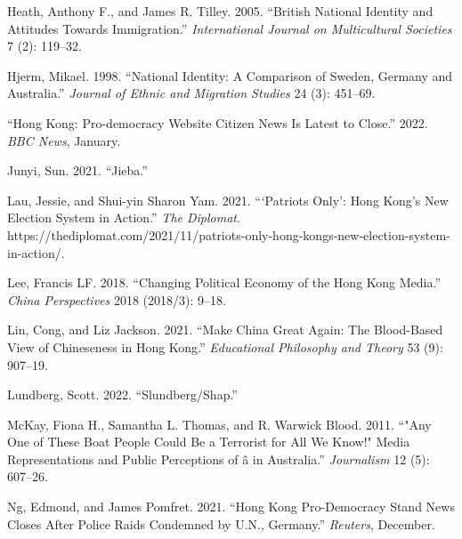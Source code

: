 \documentclass[a4paper, oneside]{report}
\begin{document}
\begin{CSLReferences}{1}{0}
\leavevmode{}%
Heath, Anthony F., and James R. Tilley. 2005. {``British National
Identity and Attitudes Towards Immigration.''} \emph{International
Journal on Multicultural Societies} 7 (2): 119--32.

\leavevmode{}%
Hjerm, Mikael. 1998. {``National Identity: {A} Comparison of {Sweden},
{Germany} and {Australia}.''} \emph{Journal of Ethnic and Migration
Studies} 24 (3): 451--69.

\leavevmode{}%
{``Hong {Kong}: {Pro-democracy} Website {Citizen News} Is Latest to
Close.''} 2022. \emph{BBC News}, January.

\leavevmode{}%
Junyi, Sun. 2021. {``Jieba.''}

\leavevmode{}%
Lau, Jessie, and Shui-yin Sharon Yam. 2021. {``{`{Patriots Only}'}:
{Hong Kong}'s {New Election System} in {Action}.''} \emph{The Diplomat}.
https://thediplomat.com/2021/11/patriots-only-hong-kongs-new-election-system-in-action/.

\leavevmode{}%
Lee, Francis LF. 2018. {``Changing Political Economy of the {Hong Kong}
Media.''} \emph{China Perspectives} 2018 (2018/3): 9--18.

\leavevmode{}%
Lin, Cong, and Liz Jackson. 2021. {``Make {China} Great Again: {The}
Blood-Based View of {Chineseness} in {Hong Kong}.''} \emph{Educational
Philosophy and Theory} 53 (9): 907--19.

\leavevmode{}%
Lundberg, Scott. 2022. {``Slundberg/Shap.''}

\leavevmode{}%
McKay, Fiona H., Samantha L. Thomas, and R. Warwick Blood. 2011.
{``"{Any} One of These Boat People Could Be a Terrorist for All We
{Know}!" {Media} Representations and Public Perceptions of
â\texteuro{}\texteuro{}
in {Australia}.''} \emph{Journalism} 12 (5): 607--26.

\leavevmode{}%
Ng, Edmond, and James Pomfret. 2021. {``Hong {Kong} Pro-Democracy {Stand
News} Closes After Police Raids Condemned by {U}.{N}., {Germany}.''}
\emph{Reuters}, December.


\end{CSLReferences}
\end{document}

